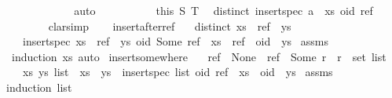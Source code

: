 \begin{isabellebody}
\ \ \ \ \ \ \ \ \isamarkupfalse%
\ {}\ \isamarkupfalse%
\ auto\isanewline
\ \ \ \ \isacommand{{\isacharbraceright}}\isamarkupfalse%
\isanewline
\ \ \ \ \isamarkupfalse%
\ this\ S\ T\ \isamarkupfalse%
\ {\isachardoublequoteopen}distinct\ {\isacharparenleft}insert{\isacharunderscore}spec\ {\isacharparenleft}a\ {\isacharhash}\ xs{\isacharparenright}\ {\isacharparenleft}oid{\isacharcomma}\ ref{\isacharparenright}{\isacharparenright}{\isachardoublequoteclose}\isanewline
\ \ \ \ \ \ \isamarkupfalse%
\ clarsimp\isanewline
\ \ \isamarkupfalse%
\isanewline
{}\isamarkupfalse%
%
\endisatagproof
{\isafoldproof}%
%
\isadelimproof
\isanewline
%
\endisadelimproof
\isanewline
{}\isamarkupfalse%
\ insert{\isacharunderscore}after{\isacharunderscore}ref{\isacharcolon}\isanewline
\ \ \ {\isachardoublequoteopen}distinct\ {\isacharparenleft}xs\ {\isacharat}\ ref\ {\isacharhash}\ ys{\isacharparenright}{\isachardoublequoteclose}\isanewline
\ \ \ {\isachardoublequoteopen}insert{\isacharunderscore}spec\ {\isacharparenleft}xs\ {\isacharat}\ ref\ {\isacharhash}\ ys{\isacharparenright}\ {\isacharparenleft}oid{\isacharcomma}\ Some\ ref{\isacharparenright}\ {\isacharequal}\ xs\ {\isacharat}\ ref\ {\isacharhash}\ oid\ {\isacharhash}\ ys{\isachardoublequoteclose}\isanewline
%
\isadelimproof
%
\endisadelimproof
%
\isatagproof
{}\isamarkupfalse%
\ assms\ \isamarkupfalse%
\ {\isacharparenleft}induction\ xs{\isacharcomma}\ auto{\isacharparenright}%
\endisatagproof
{\isafoldproof}%
%
\isadelimproof
\isanewline
%
\endisadelimproof
\isanewline
{}\isamarkupfalse%
\ insert{\isacharunderscore}somewhere{\isacharcolon}\isanewline
\ \ \ {\isachardoublequoteopen}ref\ {\isacharequal}\ None\ {\isasymor}\ {\isacharparenleft}ref\ {\isacharequal}\ Some\ r\ {\isasymand}\ r\ {\isasymin}\ set\ list{\isacharparenright}{\isachardoublequoteclose}\isanewline
\ \ \ {\isachardoublequoteopen}{\isasymexists}xs\ ys{\isachardot}\ list\ {\isacharequal}\ xs\ {\isacharat}\ ys\ {\isasymand}\ insert{\isacharunderscore}spec\ list\ {\isacharparenleft}oid{\isacharcomma}\ ref{\isacharparenright}\ {\isacharequal}\ xs\ {\isacharat}\ oid\ {\isacharhash}\ ys{\isachardoublequoteclose}\isanewline
%
\isadelimproof
%
\endisadelimproof
%
\isatagproof
{}\isamarkupfalse%
\ assms\ \isamarkupfalse%
{\isacharparenleft}induction\ list{\isacharparenright}\isanewline

\end{isabellebody}

